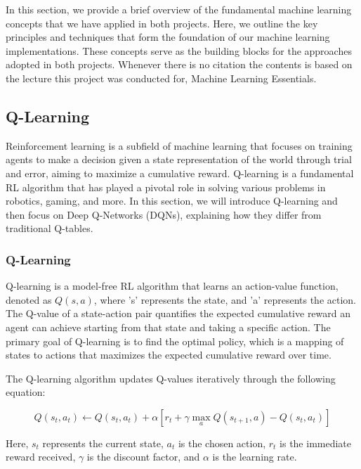 
In this section, we provide a brief overview of the fundamental machine learning concepts that we 
have applied in both projects. Here, we outline the key principles and techniques that form the foundation 
of our machine learning implementations. These concepts serve as the building blocks for the approaches adopted in both projects. Whenever there is no citation the contents is based on the lecture this project was conducted for, Machine Learning Essentials.

\subsection{Q-Learning}

Reinforcement learning is a subfield of machine learning that focuses on training agents to make a decision given a state representation of the world through trial and error, aiming to maximize a cumulative reward. Q-learning is a fundamental RL algorithm that has played a pivotal role in solving various problems in robotics, gaming, and more. In this section, we will introduce Q-learning and then focus on Deep Q-Networks (DQNs), explaining how they differ from traditional Q-tables.

\subsubsection{Q-Learning}

Q-learning is a model-free RL algorithm that learns an action-value function, denoted as \(Q(s, a)\), where 's' represents the state, and 'a' represents the action. The Q-value of a state-action pair quantifies the expected cumulative reward an agent can achieve starting from that state and taking a specific action. The primary goal of Q-learning is to find the optimal policy, which is a mapping of states to actions that maximizes the expected cumulative reward over time.

The Q-learning algorithm updates Q-values iteratively through the following equation:

\begin{equation}
	Q(s_t, a_t) \leftarrow Q(s_t, a_t) + \alpha \left[ r_t + \gamma \max_a Q(s_{t+1}, a) - Q(s_t, a_t) \right]
\end{equation}

Here, \(s_t\) represents the current state, \(a_t\) is the chosen action, \(r_t\) is the immediate reward received, \(\gamma\) is the discount factor, and \(\alpha\) is the learning rate.

